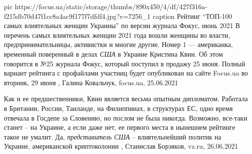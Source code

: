 \ifcmt
  pic https://focus.ua/static/storage/thumbs/890x450/4/df/427f316a-f215db70d47f1cc8a4ac9f177f7dfdf4.jpg?v=7256_1
	caption Рейтинг \enquote{ТОП-100 самых влиятельных женщин Украины} по версии журнала Фокус, июнь 2021
\fi
В перечень самых влиятельных женщин 2021 года вошли женщины во власти,
предпринимательницы, активистки и многие другие. Номер 1 — американка,
временный поверенный в делах \emph{США} в Украине Кристина Квин.  Об этом
говорится в №25 журнала Фокус, который поступил в продажу 25 июня. Полный
вариант рейтинга с профайлами участниц будет опубликован на сайте Focus.ua во
вторник, 29 июня
, 
Галина Ковальчук, focus.ua, 25.06.2021

Как и ее предшественники, Квин является весьма опытным дипломатом. Работала в
Британии, России, Таиланде, на Филиппинах, в структурах ЕС, одно время отвечала
в Госдепе за Словению, но послом не была никогда. Возможно, все-таки станет –­
на Украине, а если даже нет, ее первого места в нынешнем рейтинге такое не
умалит. Да, \emph{представитель США} – влиятельнейший политик на Украине, американской
криптоколонии
, 
Станислав Борзяков, vz.ru, 26.06.2021
